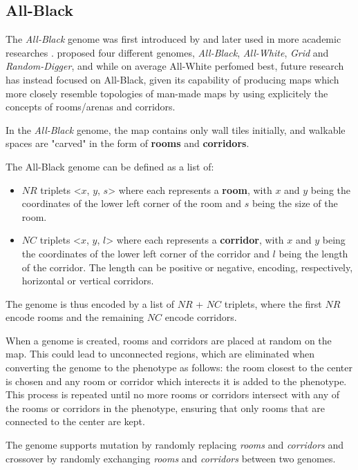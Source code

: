 \documentclass{Configuration_Files/PoliMi3i_thesis}
\begin{document}
\subsection{All-Black}
\label{subsec:all_black}
The \textit{All-Black} genome was first introduced by \citet{cardamone_evolving_2011} and later used in more academic researches \cite{lanzi_evolving_2014} \cite{loiacono_fight_2017} \cite{bari_evolutionary-based_2023}. \citeauthor{cardamone_evolving_2011} proposed four different genomes, \textit{All-Black}, \textit{All-White}, \textit{Grid} and \textit{Random-Digger}, and while on average All-White perfomed best, future research has instead focused on All-Black, given its capability of producing maps which more closely resemble topologies of man-made maps by using explicitely the concepts of rooms/arenas and corridors.

In the \textit{All-Black} genome, the map contains only wall tiles initially, and walkable spaces are "carved" in the form of \textbf{rooms} and \textbf{corridors}.

The All-Black genome can be defined as a list of:
\begin{itemize}
    \item $NR$ triplets <$x$, $y$, $s$> where each represents a \textbf{room}, with $x$ and $y$ being the coordinates of the lower left corner of the room and $s$ being the size of the room.
    \item $NC$ triplets <$x$, $y$, $l$> where each represents a \textbf{corridor}, with $x$ and $y$ being the coordinates of the lower left corner of the corridor and $l$ being the length of the corridor. The length can be positive or negative, encoding, respectively, horizontal or vertical corridors.
\end{itemize}
The genome is thus encoded by a list of $NR$ + $NC$ triplets, where the first $NR$ encode rooms and the remaining $NC$ encode corridors.

When a genome is created, rooms and corridors are placed at random on the map. This could lead to unconnected regions, which are eliminated when converting the genome to the phenotype as follows: the room closest to the center is chosen and any room or corridor which interects it is added to the phenotype. This process is repeated until no more rooms or corridors intersect with any of the rooms or corridors in the phenotype, ensuring that only rooms that are connected to the center are kept.

The genome supports mutation by randomly replacing \textit{rooms} and \textit{corridors} and crossover by randomly exchanging \textit{rooms} and \textit{corridors} between two genomes.
\end{document}
